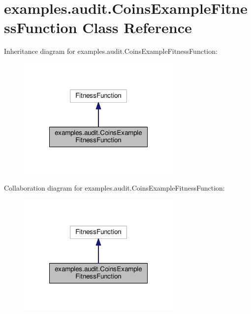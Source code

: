 \hypertarget{classexamples_1_1audit_1_1_coins_example_fitness_function}{\section{examples.\-audit.\-Coins\-Example\-Fitness\-Function Class Reference}
\label{classexamples_1_1audit_1_1_coins_example_fitness_function}
}


Inheritance diagram for examples.\-audit.\-Coins\-Example\-Fitness\-Function\-:
\nopagebreak
\begin{figure}[H]
\begin{center}
\leavevmode
\includegraphics[width=228pt]{classexamples_1_1audit_1_1_coins_example_fitness_function__inherit__graph}
\end{center}
\end{figure}


Collaboration diagram for examples.\-audit.\-Coins\-Example\-Fitness\-Function\-:
\nopagebreak
\begin{figure}[H]
\begin{center}
\leavevmode
\includegraphics[width=228pt]{classexamples_1_1audit_1_1_coins_example_fitness_function__coll__graph}
\end{center}
\end{figure}
